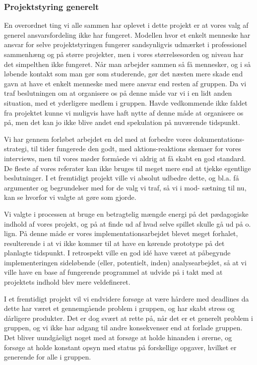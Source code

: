 \documentclass[10pt,a4paper,danish]{article}
\begin{document}
\subsubsection{Projektstyring generelt}
En overordnet ting vi alle sammen har oplevet i dette projekt er at vores valg
af generel ansvarsfordeling ikke har fungeret. Modellen hvor et enkelt menneske
har ansvar for selve projektstyringen fungerer sandsynligvis udmærket i professionel
sammenhæng og på større projekter, men i vores størrelsesorden og niveau har det
simpelthen ikke fungeret. Når man arbejder sammen så få mennesker, og i så løbende 
kontakt som man gør som studerende, gør det næsten mere skade end gavn at have et 
enkelt menneske med mere ansvar end resten af gruppen. Da vi traf beslutningen om 
at organisere os på denne måde var vi i en lidt anden situation, med et yderligere 
medlem i gruppen. Havde vedkommende ikke faldet fra projektet kunne vi muligvis
have haft nytte af denne måde at organisere os på, men det kan jo ikke blive andet
end spekulation på nuværende tidspunkt. 

Vi har gennem forløbet arbejdet en del med at forbedre vores dokumentations-
strategi, til tider fungerede den godt, med aktions-reaktions skemaer for vores
interviews, men til vores møder formåede vi aldrig at få skabt en god standard.
De fleste af vores referater kan ikke bruges til meget mere end at tjekke
egentlige beslutninger. I et fremtidigt projekt ville vi absolut udbedre dette,
og bl.a. få argumenter og begrundelser med for de valg vi traf, så vi i mod-
sætning til nu, kan se hvorfor vi valgte at gøre som gjorde.

Vi valgte i processen at bruge en betragtelig mængde energi på det pædagogiske indhold
af vores projekt, og på at finde ud af hvad selve spillet skulle gå ud på o. lign. På 
denne måde er vores implementationsarbejdet blevet meget forhalet, resulterende i at
vi ikke kommer til at have en kørende prototype på det planlagte tidspunkt. I retrospekt
ville en god idé have været at påbegynde implementeringen sideløbende (eller, potentielt, 
inden) analysearbejdet, så at vi ville have en base af fungerende programmel at udvide
på i takt med at projektets indhold blev mere veldefineret.

I et fremtidigt projekt vil vi endvidere forsøge at være hårdere med deadlines da dette har
været et gennemgående problem i gruppen, og har skabt stress og dårligere
produkter. Det er dog svært at rette på, når det er et generelt problem i
gruppen, og vi ikke har adgang til andre konsekvenser end at forlade gruppen.
Det bliver uundgåeligt noget med at forsøge at holde hinanden i ørerne, og
forsøge at holde konstant opsyn med status på forskellige opgaver, hvilket er
generende for alle i gruppen. 
\end{document}
